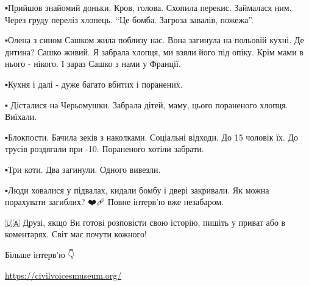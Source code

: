 ▪️Прийшов знайомий доньки. Кров, голова. Схопила перекис. Займалася ним. Через
груду переліз хлопець. \enquote{Це бомба. Загроза завалів, пожежа}. 

▪️Олена з сином Сашком жила поблизу нас. Вона загинула на польовій кухні. Де
дитина? Сашко живий. Я забрала хлопця, ми взяли його під опіку. Крім мами в
нього - нікого. І зараз Сашко з нами у Франції. 

▪️Кухня і далі - дуже багато вбитих і поранених.

▪️ Дісталися на Черьомушки. Забрала дітей, маму, цього пораненого хлопця.
Виїхали. 

▪️Блокпости. Бачила зеків з наколками. Соціальні відходи. До 15 чоловік їх. До
трусів роздягали при -10. Пораненого хотіли забрати. 

▪️Три коти. Два загинули. Одного вивезли. 

▪️Люди ховалися у підвалах, кидали бомбу і двері закривали. Як можна порахувати
загиблих?  ❤️🩹 Повне інтерв'ю вже незабаром. 

🇺🇦 Друзі, якщо Ви готові розповісти свою історію, пишіть у приват або в
коментарях. Світ має почути кожного! 

Більше інтерв'ю 👇

\url{https://civilvoicesmuseum.org/}
